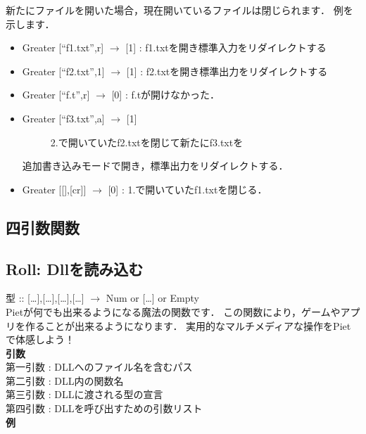 新たにファイルを開いた場合，現在開いているファイルは閉じられます．
例を示します．

\begin{itemize}
\item
  Greater {[}``f1.txt'',r{]} $\to$ {[}1{]} :
  f1.txtを開き標準入力をリダイレクトする
\item
  Greater {[}``f2.txt'',1{]} $\to$ {[}1{]} :
  f2.txtを開き標準出力をリダイレクトする
\item
  Greater {[}``f.t'',r{]} $\to$ {[}0{]} : f.tが開けなかった．
\item
  \begin{description}
  \item[Greater {[}``f3.txt'',a{]} $\to$ {[}1{]}]
  2.で開いていたf2.txtを閉じて新たにf3.txtを
  \end{description}

  追加書き込みモードで開き，標準出力をリダイレクトする．
\item
  Greater {[}{[}{]},{[}cr{]}{]} $\to$ {[}0{]} :
  1.で開いていたf1.txtを閉じる．
\end{itemize}

\subsection{四引数関数}

\subsection{Roll: Dllを読み込む}

型 :: {[}\ldots{}{]},{[}\ldots{}{]},{[}\ldots{}{]},{[}\ldots{}{]}
$\to$ Num or {[}\ldots{}{]} or
Empty\\Pietが何でも出来るようになる魔法の関数です．
この関数により，ゲームやアプリを作ることが出来るようになります．
実用的なマルチメディアな操作をPietで体感しよう！\\\textbf{引数}\\第一引数
: DLLへのファイル名を含むパス\\第二引数 : DLL内の関数名\\第三引数 :
DLLに渡される型の宣言\\第四引数 :
DLLを呼び出すための引数リスト\\\textbf{例}

